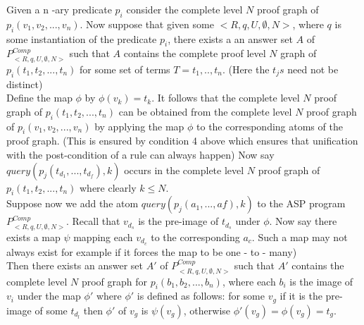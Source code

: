 \documentclass{article}
\begin{document}
Given a n -ary predicate $p_{i}$ consider the complete level $N$ proof graph of $p_{i}(v_{1},v_{2},...,v_{n})$. Now suppose that given some $<R,q,U,\emptyset,N>$, where $q$ is some instantiation of the predicate $p_{i}$, there exists a an answer set $A$ of $P_{<R,q,U,\emptyset,N>}^{Comp}$ such that $A$ contains the complete proof level $N$ graph of $p_{i}(t_{1},t_{2},...,t_{n})$ for some set of terms  $T = t_{1},..,t_{n}$. (Here the $t_{j}s$ need not be distinct) \\
\newline
Define the map $\phi$ by $\phi(v_{k})= t_{k}$. It follows that the complete level $N$ proof graph  of $p_{i}(t_{1},t_{2},...,t_{n})$ can be obtained from the complete level $N$ proof graph of $p_{i}(v_{1},v_{2},...,v_{n})$ by applying the map $\phi$ to the corresponding atoms of the proof graph. (This is ensured by condition 4 above which ensures that unification with the post-condition of a rule can always happen) Now say $query(p_{j}(t_{d_{1}},...,t_{d_{f}}),k)$ occurs in the complete level $N$ proof graph of $p_{i}(t_{1},t_{2},...,t_{n})$ where clearly $k\leq N$.\\
\newline
Suppose now we add the atom $query(p_{j}(a_{1},...,a{f}),k)$ to the ASP program $P_{<R,q,U,\emptyset,N>}^{Comp}$. Recall that $v_{d_{s}}$ is the pre-image of $t_{d_{s}}$ under $\phi$. Now say there exists a map $\psi$ mapping each $v_{d_{c}}$ to the corresponding $a_{c}$. Such a map may not always exist for example if it forces the map to be one - to - many)\\
\newline
Then there exists an answer set $A'$ of $P_{<R,q,U,\emptyset,N>}^{Comp}$ such that $A'$ contains the complete level $N$ proof graph for $p_{i}(b_{1},b_{2},...,b_{n})$, where each $b_{i}$ is the image of $v_{i}$ under the map $\phi'$ where $\phi'$ is defined as follows: for some $v_{g}$ if it is the pre-image of some $t_{d_{l}}$ then $\phi'$ of $v_{g}$ is $\psi(v_{g})$, otherwise $\phi'(v_{g}) = \phi(v_{g})= t_{g}$.
\end{document}

